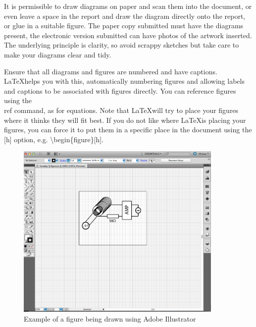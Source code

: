\documentclass{article}
\begin{document}
It is permissible to draw diagrams on paper and scan them into the document, or even leave a space in the report and draw the diagram directly onto the report, or glue in a suitable figure.  The paper copy submitted must have the diagrams present, the electronic version submitted can have photos of the artwork inserted.  The underlying principle is clarity, so avoid scrappy sketches but take care to make your diagrams clear and tidy.

Ensure that all diagrams and figures are numbered and have captions.  \LaTeX helps you with this, automatically numbering figures and allowing labels and captions to be associated with figures directly.  You can reference figures using the \\ref command, as for equations.  Note that \LaTeX will try to place your figures where it thinks they will fit best.  If you do not like where \LaTeX is placing your figures, you can force it to put them in a specific place in the document using the [h] option, e.g. \textbackslash begin\{figure\}[h].

\begin{figure}
\centering
\includegraphics[width=10cm]{example_figure.png}
\caption{Example of a figure being drawn using Adobe Illustrator}
	\label{illustrator_example}
\end{figure}
\end{document}
